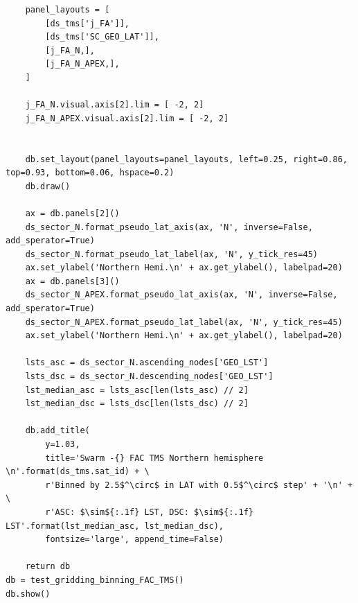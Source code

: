 \begin{verbatim}
    panel_layouts = [
        [ds_tms['j_FA']],
        [ds_tms['SC_GEO_LAT']],
        [j_FA_N,],
        [j_FA_N_APEX,],
    ]
    
    j_FA_N.visual.axis[2].lim = [ -2, 2]
    j_FA_N_APEX.visual.axis[2].lim = [ -2, 2]
    

    db.set_layout(panel_layouts=panel_layouts, left=0.25, right=0.86, top=0.93, bottom=0.06, hspace=0.2)
    db.draw()
    
    ax = db.panels[2]()
    ds_sector_N.format_pseudo_lat_axis(ax, 'N', inverse=False, add_sperator=True)
    ds_sector_N.format_pseudo_lat_label(ax, 'N', y_tick_res=45)
    ax.set_ylabel('Northern Hemi.\n' + ax.get_ylabel(), labelpad=20)
    ax = db.panels[3]()
    ds_sector_N_APEX.format_pseudo_lat_axis(ax, 'N', inverse=False, add_sperator=True)
    ds_sector_N_APEX.format_pseudo_lat_label(ax, 'N', y_tick_res=45)
    ax.set_ylabel('Northern Hemi.\n' + ax.get_ylabel(), labelpad=20)
    
    lsts_asc = ds_sector_N.ascending_nodes['GEO_LST']
    lsts_dsc = ds_sector_N.descending_nodes['GEO_LST']
    lst_median_asc = lsts_asc[len(lsts_asc) // 2]
    lst_median_dsc = lsts_dsc[len(lsts_dsc) // 2]
    
    db.add_title(
        y=1.03,
        title='Swarm -{} FAC TMS Northern hemisphere \n'.format(ds_tms.sat_id) + \
        r'Binned by 2.5$^\circ$ in LAT with 0.5$^\circ$ step' + '\n' + \
        r'ASC: $\sim${:.1f} LST, DSC: $\sim${:.1f} LST'.format(lst_median_asc, lst_median_dsc),
        fontsize='large', append_time=False)
    
    return db
db = test_gridding_binning_FAC_TMS()
db.show()
\end{verbatim}

